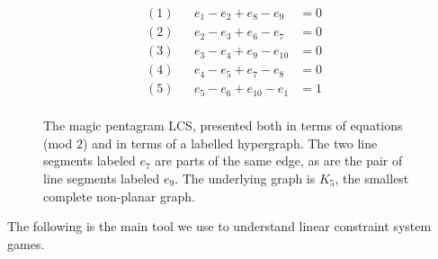 \begin{figure}[h]
	\begin{center}
	\begin{multicols}{2}

	    \begin{align}
	    (1)&& e_1 - e_2 + e_8 - e_9 	&= 0\\
	    (2)&& e_2 - e_3 + e_6 - e_7 	&= 0\\
	    (3)&& e_3 - e_4 + e_9 - e_{10} 	&= 0\\
	    (4)&& e_4 - e_5 + e_7 - e_{8} 	&= 0\\
	    (5)&& e_5 - e_6 + e_{10} - e_1 	&= 1\\
	    \end{align}
	\end{multicols}
    \end{center}
    \caption{The magic pentagram LCS, presented both in terms of equations (mod $2$) and in terms of a labelled hypergraph. The two line segments labeled $e_7$ are parts of the same edge, as are the pair of line segments labeled $e_9$. The underlying graph is $K_5$, the smallest complete non-planar graph.} 
    \label{fig:magic-pentagram-equations}
\end{figure}

The following is the main tool we use to understand linear constraint system games.

